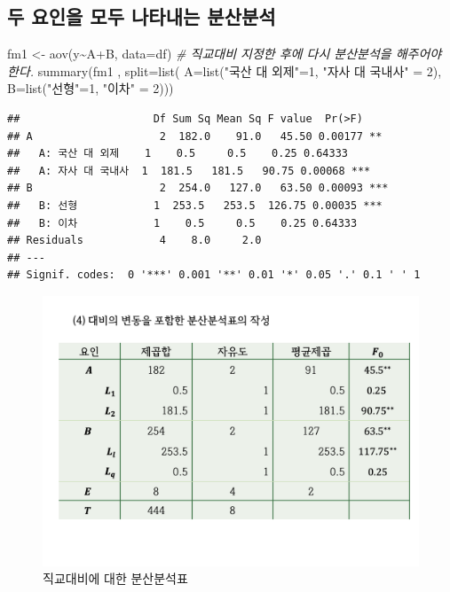 \documentclass[
]{book}
\newenvironment{Shaded}{\begin{snugshade}}{\end{snugshade}}
\newcommand{\AttributeTok}[1]{\textcolor[rgb]{0.77,0.63,0.00}{#1}}
\newcommand{\CommentTok}[1]{\textcolor[rgb]{0.56,0.35,0.01}{\textit{#1}}}
\newcommand{\DecValTok}[1]{\textcolor[rgb]{0.00,0.00,0.81}{#1}}
\newcommand{\FunctionTok}[1]{\textcolor[rgb]{0.00,0.00,0.00}{#1}}
\newcommand{\NormalTok}[1]{#1}
\newcommand{\OtherTok}[1]{\textcolor[rgb]{0.56,0.35,0.01}{#1}}
\newcommand{\SpecialCharTok}[1]{\textcolor[rgb]{0.00,0.00,0.00}{#1}}
\newcommand{\StringTok}[1]{\textcolor[rgb]{0.31,0.60,0.02}{#1}}
\begin{document}
\hypertarget{uxb450-uxc694uxc778uxc744-uxbaa8uxb450-uxb098uxd0c0uxb0b4uxb294-uxbd84uxc0b0uxbd84uxc11d}{%
\subsection{두 요인을 모두 나타내는 분산분석}\label{uxb450-uxc694uxc778uxc744-uxbaa8uxb450-uxb098uxd0c0uxb0b4uxb294-uxbd84uxc0b0uxbd84uxc11d}}

\begin{Shaded}
\begin{Highlighting}[]
\NormalTok{fm1 }\OtherTok{\textless{}{-}} \FunctionTok{aov}\NormalTok{(y}\SpecialCharTok{\textasciitilde{}}\NormalTok{A}\SpecialCharTok{+}\NormalTok{B, }\AttributeTok{data=}\NormalTok{df) }\CommentTok{\# 직교대비 지정한 후에 다시 분산분석을 해주어야 한다.}
\FunctionTok{summary}\NormalTok{(fm1 , }\AttributeTok{split=}\FunctionTok{list}\NormalTok{( }\AttributeTok{A=}\FunctionTok{list}\NormalTok{(}\StringTok{"국산 대 외제"}\OtherTok{=}\DecValTok{1}\NormalTok{, }\StringTok{"자사 대 국내사"} \OtherTok{=} \DecValTok{2}\NormalTok{), }\AttributeTok{B=}\FunctionTok{list}\NormalTok{(}\StringTok{"선형"}\OtherTok{=}\DecValTok{1}\NormalTok{, }\StringTok{"이차"} \OtherTok{=} \DecValTok{2}\NormalTok{))) }
\end{Highlighting}
\end{Shaded}

\begin{verbatim}
##                     Df Sum Sq Mean Sq F value  Pr(>F)    
## A                    2  182.0    91.0   45.50 0.00177 ** 
##   A: 국산 대 외제    1    0.5     0.5    0.25 0.64333    
##   A: 자사 대 국내사  1  181.5   181.5   90.75 0.00068 ***
## B                    2  254.0   127.0   63.50 0.00093 ***
##   B: 선형            1  253.5   253.5  126.75 0.00035 ***
##   B: 이차            1    0.5     0.5    0.25 0.64333    
## Residuals            4    8.0     2.0                    
## ---
## Signif. codes:  0 '***' 0.001 '**' 0.01 '*' 0.05 '.' 0.1 ' ' 1
\end{verbatim}

\begin{figure}
\centering
\includegraphics{slide04.png}
\caption{직교대비에 대한 분산분석표}
\end{figure}

  
\end{document}
